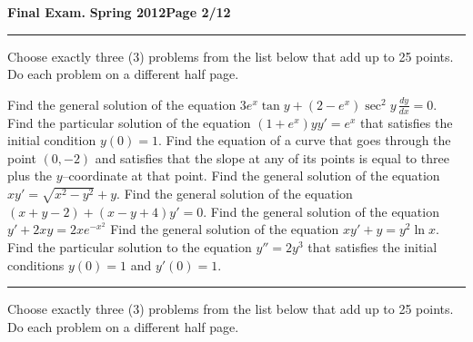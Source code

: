 \documentclass[12pt]{article}
\begin{document}

\hfill{\large\bf Final Exam.}\hfill{\large\bf
  Spring 2012}\hfill{\large\bf Page 2/12}\hrule

\vspace{0.5cm}
 Choose exactly three (3) problems from the list below that add up to 25 points.   Do each problem on a different half page.

{\problem[5pts] Find the general solution of the equation $3e^x \tan y +
(2-e^x) \sec^2 y \, \frac{dy}{dx} = 0$.}
{\problem[5pts] Find the particular solution of the equation $(1+e^x)yy'=e^x$
that satisfies the initial condition $y(0)=1$.}
{\problem[5pts] Find the equation of a curve that goes through the point
$(0,-2)$ and satisfies that the slope at any of its points is equal to three
plus the $y$--coordinate at that point.}
{\problem[10pts] Find the general solution of the equation $xy'=\sqrt{x^2-y^2}+y$.}
{\problem[10pts] Find the general solution of the equation $(x+y-2) + (x-y+4)y'=0$.}
{\problem[10pts] Find the general solution of the equation $y'+2xy=2xe^{-x^2}$}
{\problem[10pts] Find the general solution of the equation $xy'+y=y^2\ln x$.}
{\problem[10pts] Find the particular solution to the equation $y''=2y^3$ that satisfies the initial conditions $y(0)=1$ and $y'(0)=1$.}

\hrule

\vspace{0.5cm}
 Choose exactly three (3) problems from the list below that add up to 25 points.   Do each problem on a different half page.
\end{document}
